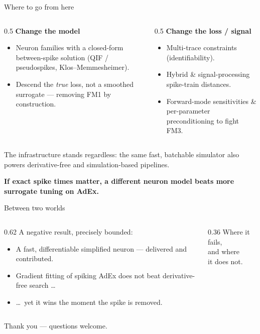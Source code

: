 \documentclass[17pt, t, lualatex]{beamer}
\newcommand{\good}[1]{{\color{dark green}#1}}
\newcommand{\bad}[1]{{\color{dark brick}#1}}
\newcommand{\hl}[1]{{\color{KTH blue}#1}}
\newcommand{\takeaway}[1]{%
  \vfill
  {\centering\usebeamercolor[fg]{structure}%
   \small\textbf{#1}\par}%
  \vspace{2pt}%
}
\begin{document}
\begin{frame}{Where to go from here}
\begin{columns}[T]
\begin{column}{0.5\textwidth}
\textbf{Change the model}
\begin{itemize}
  \item Neuron families with a \hl{closed-form between-spike solution} (QIF / pseudospikes, Klos--Memmesheimer).
  \item Descend the \emph{true} loss, not a smoothed surrogate --- removing FM1 by construction.
\end{itemize}
\end{column}
\begin{column}{0.5\textwidth}
\textbf{Change the loss / signal}
\begin{itemize}
  \item Multi-trace constraints (identifiability).
  \item Hybrid \& signal-processing spike-train distances.
  \item Forward-mode sensitivities \& per-parameter preconditioning to fight FM3.
\end{itemize}
\end{column}
\end{columns}
\vspace{0.2cm}
\small The infrastructure stands regardless: the same fast, batchable simulator also powers derivative-free and simulation-based pipelines.
\takeaway{If exact spike times matter, a different neuron model beats more surrogate tuning on AdEx.}
\end{frame}

\begin{frame}{Between two worlds}
\vspace{0.3cm}
\begin{columns}[c]
\begin{column}{0.62\textwidth}
\large
A negative result, precisely bounded:
\vspace{0.3cm}
\begin{itemize}
  \item A \good{fast, differentiable} simplified neuron --- delivered and contributed.
  \item Gradient fitting of spiking AdEx \bad{does not beat} derivative-free search \dots
  \item \dots\ \good{yet} it wins the moment the spike is removed.
\end{itemize}
\end{column}
\begin{column}{0.36\textwidth}
\centering
\hl{\Large Where it fails,\\[4pt] and where\\[4pt] it does not.}
\end{column}
\end{columns}
\vspace{0.4cm}
\centering
\normalsize Thank you --- questions welcome.
\end{frame}
\end{document}
